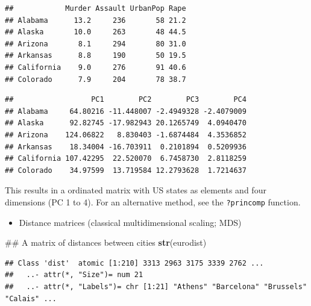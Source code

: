 \documentclass[]{book}
\newenvironment{Shaded}{\begin{snugshade}}{\end{snugshade}}
\newcommand{\KeywordTok}[1]{\textcolor[rgb]{0.13,0.29,0.53}{\textbf{#1}}}
\newcommand{\StringTok}[1]{\textcolor[rgb]{0.31,0.60,0.02}{#1}}
\newcommand{\OperatorTok}[1]{\textcolor[rgb]{0.81,0.36,0.00}{\textbf{#1}}}
\newcommand{\NormalTok}[1]{#1}
\providecommand{\tightlist}{%
  \setlength{\itemsep}{0pt}\setlength{\parskip}{0pt}}
\theoremstyle{definition}
\theoremstyle{definition}
\theoremstyle{remark}
\begin{document}
\begin{verbatim}
##            Murder Assault UrbanPop Rape
## Alabama      13.2     236       58 21.2
## Alaska       10.0     263       48 44.5
## Arizona       8.1     294       80 31.0
## Arkansas      8.8     190       50 19.5
## California    9.0     276       91 40.6
## Colorado      7.9     204       78 38.7
\end{verbatim}

\begin{Shaded}
\end{Shaded}

\begin{verbatim}
##                  PC1        PC2        PC3        PC4
## Alabama     64.80216 -11.448007 -2.4949328 -2.4079009
## Alaska      92.82745 -17.982943 20.1265749  4.0940470
## Arizona    124.06822   8.830403 -1.6874484  4.3536852
## Arkansas    18.34004 -16.703911  0.2101894  0.5209936
## California 107.42295  22.520070  6.7458730  2.8118259
## Colorado    34.97599  13.719584 12.2793628  1.7214637
\end{verbatim}

This results in a ordinated matrix with US states as elements and four
dimensions (PC 1 to 4). For an alternative method, see the
\texttt{?princomp} function.

\begin{itemize}
\tightlist
\item
  Distance matrices (classical multidimensional scaling; MDS)
\end{itemize}

\begin{Shaded}
\begin{Highlighting}[]
\NormalTok{## A matrix of distances between cities}
\KeywordTok{str}\NormalTok{(eurodist)}
\end{Highlighting}
\end{Shaded}

\begin{verbatim}
## Class 'dist'  atomic [1:210] 3313 2963 3175 3339 2762 ...
##   ..- attr(*, "Size")= num 21
##   ..- attr(*, "Labels")= chr [1:21] "Athens" "Barcelona" "Brussels" "Calais" ...
\end{verbatim}
\end{document}

